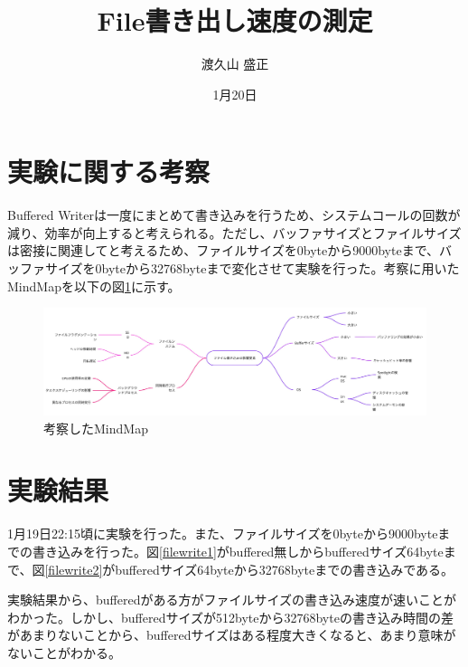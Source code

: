 \documentclass[a4paper, 11pt, titlepage]{jsarticle}
\title{File書き出し速度の測定}
\author{渡久山 盛正}
\date{1月20日}
\begin{document}
\maketitle

\section{実験に関する考察}

Buffered Writerは一度にまとめて書き込みを行うため、システムコールの回数が減り、効率が向上すると考えられる。ただし、バッファサイズとファイルサイズは密接に関連してと考えるため、ファイルサイズを0byteから9000byteまで、バッファサイズを0byteから32768byteまで変化させて実験を行った。考察に用いたMindMapを以下の図\ref{mind}に示す。

\begin{figure}[htbp]
	\centering
	\includegraphics[width=140mm]{../img/MindMap.pdf}
	\caption{考察したMindMap}
	\label{mind}
\end{figure}

\section{実験結果}
1月19日22:15頃に実験を行った。また、ファイルサイズを0byteから9000byteまでの書き込みを行った。図\ref{filewrite1}がbuffered無しからbufferedサイズ64byteまで、図\ref{filewrite2}がbufferedサイズ64byteから32768byteまでの書き込みである。

実験結果から、bufferedがある方がファイルサイズの書き込み速度が速いことがわかった。しかし、bufferedサイズが512byteから32768byteの書き込み時間の差があまりないことから、bufferedサイズはある程度大きくなると、あまり意味がないことがわかる。

\clearpage
\end{document}
